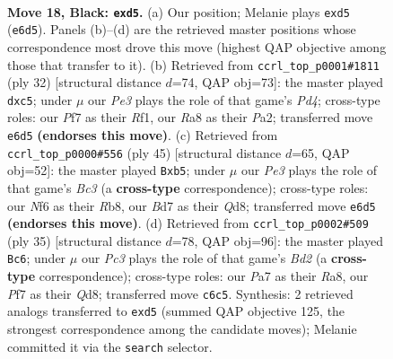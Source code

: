 \documentclass[11pt]{article}
\begin{document}
\clearpage

\begin{figure}[p]\centering
\begin{subfigure}{0.46\textwidth}\centering
\resizebox{\linewidth}{!}{%
\newchessgame
\chessboard[
  setfen={rr1q2k1/p2b1ppp/2p1pn2/p2P4/2B1P2P/1P1Q1NP1/P4P2/R3R1K1 b - - 0 18},
  showmover=false,
  pgfstyle=straightmove, color=movearrow, markmove={e6-d5}
]}
\caption{}
\end{subfigure}\hfill
\begin{subfigure}{0.46\textwidth}\centering
\resizebox{\linewidth}{!}{%
\newchessgame
\chessboard[
  setfen={r2qr1k1/pb3ppp/1p3n2/2pp4/3P1P2/1PR2N2/P1Q1PPBP/5RK1 w - - 0 17},
  showmover=false,
  pgfstyle=straightmove, color=movearrow, markmove={d4-c5}
]}
\caption{}
\end{subfigure}
\\[4pt]
\begin{subfigure}{0.46\textwidth}\centering
\resizebox{\linewidth}{!}{%
\newchessgame
\chessboard[
  setfen={1r1q2k1/3r1ppp/p1bppn2/1P6/4P3/P1NB1P1P/1PR2QP1/3R2K1 b - - 0 23},
  showmover=false,
  pgfstyle=straightmove, color=movearrow, markmove={c6-b5}
]}
\caption{}
\end{subfigure}\hfill
\begin{subfigure}{0.46\textwidth}\centering
\resizebox{\linewidth}{!}{%
\newchessgame
\chessboard[
  setfen={r2q1r1k/1ppb2pp/4pp2/p3Pn2/P1RP3P/5NP1/1P3PB1/R2Q2K1 b - - 0 18},
  showmover=false,
  pgfstyle=straightmove, color=movearrow, markmove={d7-c6}
]}
\caption{}
\end{subfigure}
\caption{\textbf{Move 18, Black: \texttt{exd5}.} (a) Our position; Melanie plays \texttt{exd5} (\texttt{e6d5}). Panels (b)--(d) are the retrieved master positions whose correspondence most drove this move (highest QAP objective among those that transfer to it). (b) Retrieved from \texttt{ccrl\_top\_p0001\#1811} (ply 32) [structural distance $d$=74, QAP obj=73]: the master played \texttt{dxc5}; under $\mu$ our \emph{Pe3} plays the role of that game's \emph{Pd4}; cross-type roles: our \emph{P}f7 as their \emph{R}f1, our \emph{R}a8 as their \emph{P}a2; transferred move \texttt{e6d5} \textbf{(endorses this move)}. (c) Retrieved from \texttt{ccrl\_top\_p0000\#556} (ply 45) [structural distance $d$=65, QAP obj=52]: the master played \texttt{Bxb5}; under $\mu$ our \emph{Pe3} plays the role of that game's \emph{Bc3} (a \textbf{cross-type} correspondence); cross-type roles: our \emph{N}f6 as their \emph{R}b8, our \emph{B}d7 as their \emph{Q}d8; transferred move \texttt{e6d5} \textbf{(endorses this move)}. (d) Retrieved from \texttt{ccrl\_top\_p0002\#509} (ply 35) [structural distance $d$=78, QAP obj=96]: the master played \texttt{Bc6}; under $\mu$ our \emph{Pc3} plays the role of that game's \emph{Bd2} (a \textbf{cross-type} correspondence); cross-type roles: our \emph{P}a7 as their \emph{R}a8, our \emph{P}f7 as their \emph{Q}d8; transferred move \texttt{c6c5}. Synthesis: 2 retrieved analogs transferred to \texttt{exd5} (summed QAP objective 125, the strongest correspondence among the candidate moves); Melanie committed it via the \texttt{search} selector.}
\label{fig:thought-m35}
\end{figure}
\end{document}
